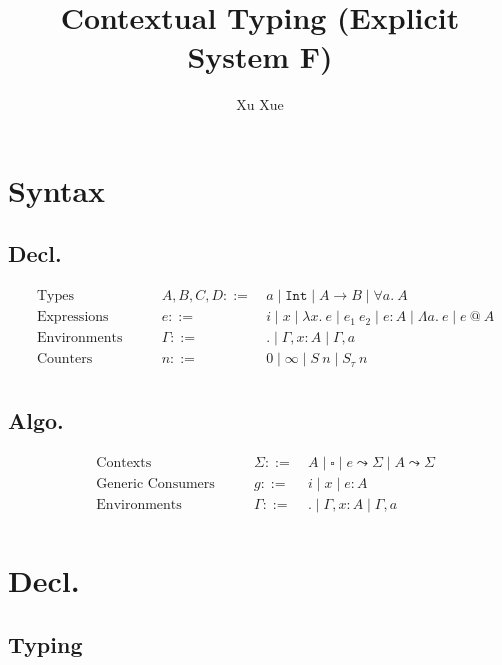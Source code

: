 \documentclass{article}
\title{Contextual Typing (Explicit System F)}
\author{Xu Xue}
\begin{document}
\maketitle

\section{Syntax}

\subsection{Decl.}

\begin{align*}
&\text{Types} \quad\quad &A, B, C, D ::=&~ a \mid \mathtt{Int} \mid A \rightarrow B \mid \forall a.~A\\
&\text{Expressions} \quad \quad &e::=&~ i \mid x \mid \lambda x . ~e \mid e_1~e_2 \mid e : A \mid \Lambda a.~e \mid e ~@~ A\\
&\text{Environments} \quad\quad &\Gamma::=&~ . \mid \Gamma, x : A \mid \Gamma, a\\
&\text{Counters} \quad\quad &n ::=&~ 0 \mid \infty \mid S~n \mid S_{\tau}~n\\
\end{align*}

\subsection{Algo.}

\begin{align*}
    &\text{Contexts} \quad\quad &\Sigma ::=&~ A \mid \square \mid \boxed{e} \leadsto \Sigma \mid \boxed{A} \leadsto \Sigma\\
    &\text{Generic Consumers} \quad \quad &g::=&~ i \mid x \mid e : A \\
    &\text{Environments} \quad\quad &\Gamma ::=&~ . \mid \Gamma, x : A \mid \Gamma, a \\
\end{align*}


\section{Decl.}

\subsection{Typing}
\end{document}
